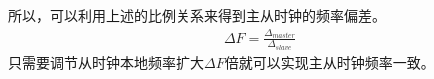 所以，可以利用上述的比例关系来得到主从时钟的频率偏差。
\begin{align}
	\Delta F = \frac{\Delta _{master}}{\Delta _{slave}}
\end{align}
只需要调节从时钟本地频率扩大$\Delta F$倍就可以实现主从时钟频率一致。





